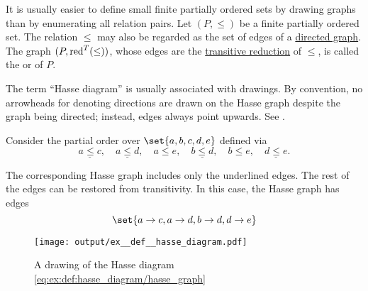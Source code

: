 \begin{definition}\label{def:hasse_diagram}
  It is usually easier to define small finite partially ordered sets by drawing graphs than by enumerating all relation pairs. Let \( (P, \leq) \) be a finite partially ordered set. The relation \( \leq \) may also be regarded as the set of edges of a \hyperref[def:quiver/simple]{directed graph}. The graph \( (P, \operatorname{red}^T(\leq)) \), whose edges are the \hyperref[def:relation_closures/transitive]{transitive reduction} of \( \leq \), is called the  or  of \( P \).

  The term \enquote{Hasse diagram} is usually associated with drawings. By convention, no arrowheads for denoting directions are drawn on the Hasse graph despite the graph being directed; instead, edges always point upwards. See .
\end{definition}

\begin{example}\label{ex:def:hasse_diagram}
  Consider the partial order over \( \set{ a, b, c, d, e } \) defined via
  \begin{equation}\label{eq:ex:def:hasse_diagram/partially ordered set}
    \underline{a \leq c},\quad \underline{a \leq d},\quad a \leq e,\quad \underline{b \leq d},\quad b \leq e,\quad \underline{d \leq e}.
  \end{equation}

  The corresponding Hasse graph includes only the underlined edges. The rest of the edges can be restored from transitivity. In this case, the Hasse graph has edges
  \begin{equation}\label{eq:ex:def:hasse_diagram/hasse_graph}
    \set{ a \to c, a \to d, b \to d, d \to e }
  \end{equation}

  \begin{figure}
    \centering
    \texttt{[image: output/ex\_\_def\_\_hasse\_diagram.pdf]}
    \caption{A drawing of the Hasse diagram \eqref{eq:ex:def:hasse_diagram/hasse_graph}}
    \label{fig:ex:def:hasse_diagram}
  \end{figure}
\end{example}

